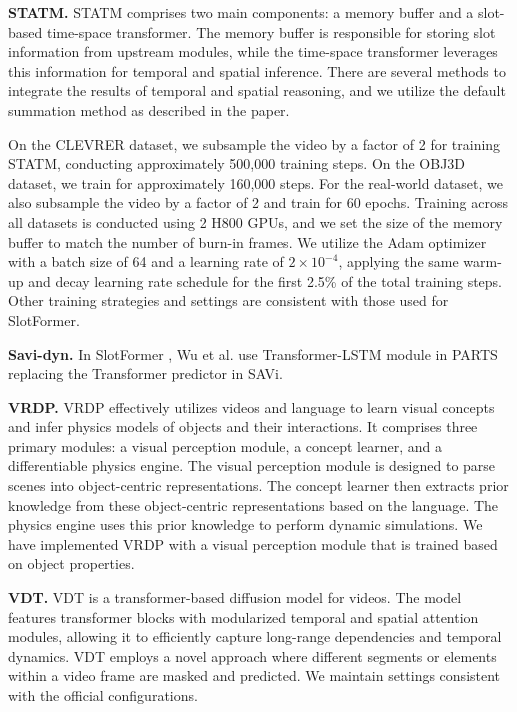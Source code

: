 \documentclass[sigconf]{acmart}
\begin{document}
\textbf{STATM.} STATM \cite{li2024reasoningenhanced} comprises two main components: a memory buffer and a slot-based time-space transformer. The memory buffer is responsible for storing slot information from upstream modules, while the time-space transformer leverages this information for temporal and spatial inference. There are several methods to integrate the results of temporal and spatial reasoning, and we utilize the default summation method as described in the paper. 

On the CLEVRER dataset, we subsample the video by a factor of 2 for training STATM, conducting approximately 500,000 training steps. On the OBJ3D dataset, we train for approximately 160,000 steps. For the real-world dataset, we also subsample the video by a factor of 2 and train for 60 epochs. Training across all datasets is conducted using 2 H800 GPUs, and we set the size of the memory buffer to match the number of burn-in frames. We utilize the Adam optimizer with a batch size of 64 and a learning rate of $2\times 10^{-4}$, applying the same warm-up and decay learning rate schedule for the first 2.5\% of the total training steps. Other training strategies and settings are consistent with those used for SlotFormer.

\textbf{Savi-dyn.} In SlotFormer \cite{wu2023SlotFormer}, Wu et al. use Transformer-LSTM module in PARTS \cite{zoran2021parts} replacing the Transformer predictor in SAVi.

\textbf{VRDP.} VRDP \cite{ding2021dynamic} effectively utilizes videos and language to learn visual concepts and infer physics models of objects and their interactions. It comprises three primary modules: a visual perception module, a concept learner, and a differentiable physics engine. The visual perception module is designed to parse scenes into object-centric representations. The concept learner then extracts prior knowledge from these object-centric representations based on the language. The physics engine uses this prior knowledge to perform dynamic simulations. We have implemented VRDP with a visual perception module that is trained based on object properties.

\textbf{VDT.} VDT \cite{lu2023vdt} is a transformer-based diffusion model for videos. The model features transformer blocks with modularized temporal and spatial attention modules, allowing it to efficiently capture long-range dependencies and temporal dynamics. VDT employs a novel approach where different segments or elements within a video frame are masked and predicted. We maintain settings consistent with the official configurations.
\end{document}
